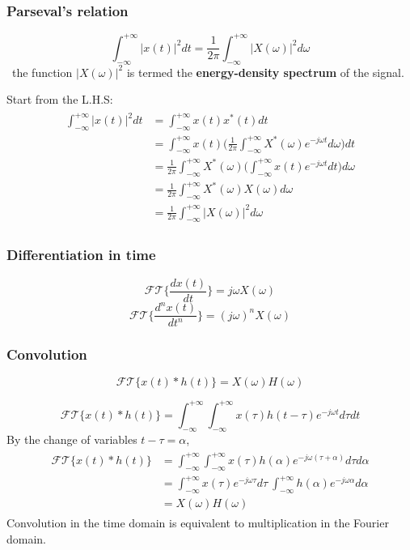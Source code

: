 \subsubsection{Parseval's relation}
\[ 
    \int_{-\infty}^{+\infty} \lvert x(t) \rvert^{2} dt = \frac{1}{2\pi} \int_{-\infty}^{+\infty} \lvert X(\omega) \rvert^{2} d\omega 
\]
\ the function $\lvert X(\omega) \rvert^{2}$ is termed the \textbf{energy-density spectrum} of the signal.
\begin{dv}{}
    Start from the L.H.S:
    \begin{align*} \begin{split}
     \int_{-\infty}^{+\infty} \lvert x(t) \rvert^{2} dt &= \int_{-\infty}^{+\infty} x(t) x^{*}(t) dt \\
    &= \int_{-\infty}^{+\infty} x(t) \bigg( \frac{1}{2\pi} \int_{-\infty}^{+\infty} X^{*}(\omega) e^{-j\omega t} d\omega \bigg) dt\\
    &= \frac{1}{2\pi} \int_{-\infty}^{+\infty} X^{*}(\omega)\bigg( \int_{-\infty}^{+\infty} x(t) e^{-j\omega t} dt \bigg) d\omega \\
    &= \frac{1}{2\pi} \int_{-\infty}^{+\infty} X^{*}(\omega)X(\omega) d\omega \\
    & = \frac{1}{2\pi} \int_{-\infty}^{+\infty}  \lvert X(\omega) \rvert^{2} d\omega 
    \end{split} \end{align*}
\end{dv}

\subsubsection{Differentiation in time}
\[ 
\mathcal{FT} \bigg\{ \frac{dx(t)}{dt} \bigg\} = j\omega X(\omega) 
\]
\[ 
\mathcal{FT} \bigg\{ \frac{d^{n}x(t)}{dt^{n}} \bigg\} = (j\omega)^{n} X(\omega) 
\]

\subsubsection{Convolution}
\[ 
\mathcal{FT}\{ x(t)*h(t) \} = X(\omega)H(\omega) 
\]

\begin{dv}{}
    \[ 
    \mathcal{FT}\{ x(t)*h(t)\} = \int_{-\infty}^{+\infty}\int_{-\infty}^{+\infty} x(\tau)h(t-\tau)e^{-j\omega t}d\tau dt 
    \]
    By the change of variables $t-\tau = \alpha$,
    \begin{align*} 
    \begin{split}
        \mathcal{FT}\{ x(t)*h(t)\} &= \int_{-\infty}^{+\infty}\int_{-\infty}^{+\infty} x(\tau)h(\alpha)e^{-j\omega (\tau+\alpha)}d\tau d\alpha \\
        &=\int_{-\infty}^{+\infty}x(\tau)e^{-j\omega \tau}d\tau \ \int_{-\infty}^{+\infty}h(\alpha)e^{-j\omega \alpha}d\alpha\\
        &= X(\omega)H(\omega)
     \end{split} 
     \end{align*}
     Convolution in the time domain is equivalent to multiplication in the Fourier domain.
\end{dv}

